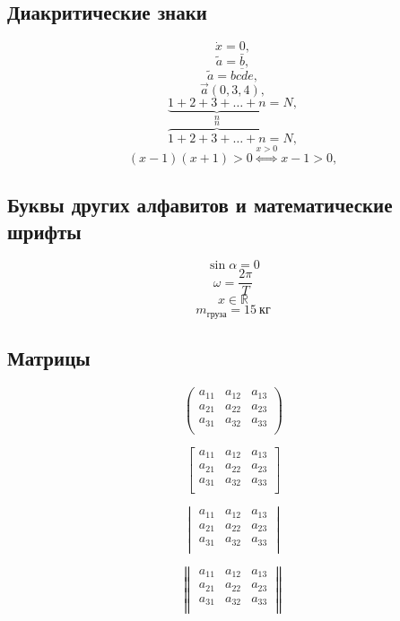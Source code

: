 \documentclass[a4paper,12pt]{article}
\begin{document}
\subsection{Диакритические знаки}

\[ \dot{x}=0,\]
\[ \tilde{a}=\bar{b}, \]
\[ \tilde{a}=\overline{bcde}, \]
\[ \overrightarrow{a} (0,3,4), \]
\[ \underbrace{1+2+3+\dots+n}_{n}=N, \]
\[ \overbrace{1+2+3+\dots+n}^{n}=N, \]
\[ (x-1)(x+1)>0 \stackrel{x>0}{\Longleftrightarrow} x-1>0, \]

\subsection{Буквы других алфавитов и математические шрифты}
\[ \sin \alpha =0 \]
\[ \omega =  \frac{2\pi}{T} \]
\[ x \in \mathbb{R} \]
\[ m_{\text{груза}}= 15~\text{кг} \]


\subsection{Матрицы}

\[ \begin{pmatrix}

a_{11} & a_{12} & a_{13} \\
a_{21} & a_{22} & a_{23} \\
a_{31} & a_{32} & a_{33} \\

\end{pmatrix} \]


\[ \begin{bmatrix}

a_{11} & a_{12} & a_{13} \\
a_{21} & a_{22} & a_{23} \\
a_{31} & a_{32} & a_{33} \\

\end{bmatrix} \]


\[ \begin{vmatrix}

a_{11} & a_{12} & a_{13} \\
a_{21} & a_{22} & a_{23} \\
a_{31} & a_{32} & a_{33} \\

\end{vmatrix} \]


\[ \begin{Vmatrix}

a_{11} & a_{12} & a_{13} \\
a_{21} & a_{22} & a_{23} \\
a_{31} & a_{32} & a_{33} \\

\end{Vmatrix} \]
\end{document}
